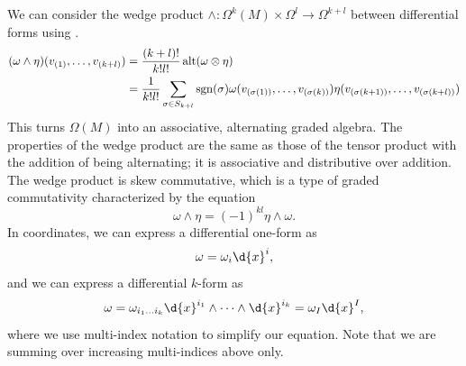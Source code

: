 \documentclass[a4paper,12pt]{article}
\begin{document}
We can consider the wedge product $\wedge \colon \Omega^k(M) \times \Omega^l \to \Omega^{k+l}$ between differential forms using .
\begin{align}
    (\omega \wedge \eta)(v_{(1)}, \ldots, v_{(k+l)}) &= \frac{(k+l)!}{k!l!} \operatorname{alt}(\omega \otimes \eta) \\
    &= \frac{1}{k!l!} \sum_{\sigma \in S_{k+l}} \operatorname{sgn}(\sigma) \omega(v_{(\sigma(1))}, \ldots, v_{(\sigma(k))}) \eta(v_{(\sigma(k+1))}, \ldots, v_{(\sigma(k+l))}) \nonumber
\end{align}
This turns $\Omega(M)$ into an associative, alternating graded algebra.
The properties of the wedge product are the same as those of the tensor product with the addition of being alternating; it is associative and distributive over addition.
The wedge product is skew commutative, which is a type of graded commutativity characterized by the equation
\begin{equation}
    \omega \wedge \eta = (-1)^{kl} \eta \wedge \omega.
\end{equation}
In coordinates, we can express a differential one-form as
\begin{equation}
    \omega = \omega_i \d{x}^i,
\end{equation}
and we can express a differential $k$-form as
\begin{equation}
    \omega = \omega_{i_1 \ldots i_k} \d{x}^{i_1} \wedge \cdots \wedge \d{x}^{i_k} = \omega_I \d{x}^I,
\end{equation}
where we use multi-index notation to simplify our equation.
Note that we are summing over increasing multi-indices above only.
\end{document}
